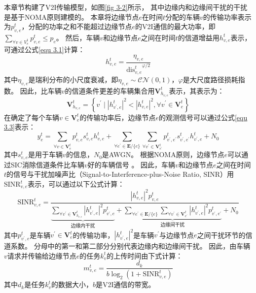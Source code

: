 本章节构建了V2I传输模型，如图\ref{fig 3-2}所示， 其中边缘内和边缘间干扰的干扰是基于NOMA原则建模的。
本章将边缘节点$e$在时间$t$分配的车辆$v$的传输功率表示为$p_{v, e}^{t}$，分配的功率之和不能超过边缘节点$e$的V2I通信的最大功率，即$\sum_{\forall v \in {V}_{e}^{t}} p_{v, e}^{t} \leq p_{e}$。
然后，车辆$v$和边缘节点$e$之间在时间$t$的信道增益用$h_{v, e}^t$表示，可通过公式\ref{equ 3.1}\cite{sun2020performance}计算：
\begin{equation}
	h_{v, e}^t = \frac{\eta_{v, e}}{{\operatorname{dis}_{v, e}^{t}}^{\varphi/2}}
	\label{equ 3.1}
\end{equation}
\noindent 其中$\eta_{v, e}$是瑞利分布的小尺度衰减，即$\eta_{v, e} \sim \mathcal{CN}(0, 1)$，$\varphi$是大尺度路径损耗指数。
因此，比车辆$v$的信道条件更差的车辆集合用$\mathbf{V}_{h_{v, e}}^{t}$表示，其表示为：
\begin{equation}
	\mathbf{V}_{h_{v, e}}^{t} = \left \{ v^{\prime} \mid  \left|h_{v^{\prime}, e}^t \right|^{2} < \left| h_{v, e}^t\right |^{2} , \forall v^{\prime} \in \mathbf{V}_{e}^{t} \right \}
\end{equation}
在确定了每个车辆$v \in \mathbf{V}_{e}^{t}$的传输功率后，边缘节点$e$的观测信号可以通过公式\ref{equ 3.3}\cite{islam2017power}表示：
\begin{equation}
	y_e^{t} = \sum_{\forall v \in \mathbf{V}_{e}^{t}} p_{v, e}^{t} s_{v, e}^{t} h_{v, e}^t + \sum\limits_{\forall e^{\prime} \in \mathbf{E} / \{e\}} \sum\limits_{\forall v^{\prime} \in \mathbf{V}_{e^{\prime}}^{t}} p_{v^{\prime}, e^{\prime}}^{t} s_{v^{\prime}, e^{\prime}}^{t} h_{v^{\prime}, e}^t + N_{0}
	\label{equ 3.3}
\end{equation}
其中$s_{v, e}^{t}$是用于车辆$v$的信息，$N_{0}$是AWGN。
根据NOMA原则，边缘节点$e$可以通过SIC消除信道条件比车辆$v$好的车辆信号 \cite{du2021ji}。
因此，车辆$v$和边缘节点$e$之间在时间$t$的信号与干扰加噪声比（Signal-to-Interference-plus-Noise Ratio, SINR）用$\mathrm{SINR}_{v, e}^t$表示，可以通过以下公式计算：
\begin{equation}
	\mathrm{SINR}_{v, e}^t = \frac{ |h_{v, e}^t| ^{2}  p_{v, e}^{t}}{ \underbrace{\sum\limits_{\forall v^{\prime} \in \mathbf{V}_{h_{v, e}}^{t}} |h_{v^{\prime}, e}^t|^2 p_{v^{\prime}, e}^{t}}_{\text {边缘内干扰}} + \underbrace{\sum\limits_{\forall e^{\prime} \in \mathbf{E} / \{e\}} \sum\limits_{\forall v^{\prime} \in \mathbf{V}_{e^{\prime}}^{t}} |h_{v^{\prime}, e}^t|^2 p_{v^{\prime}, e^{\prime}}^{t}}_{\text {边缘间干扰}} + N_{0}}
\end{equation}
其中$p_{v^{\prime}, e}^{t}$是车辆$v^{\prime} \in \mathbf{V}_{e}^{t}$的传输功率，$|h_{v^{\prime}, e}^t|^2$是车辆$v^{\prime}$与边缘节点$e$之间干扰环节的信道系数。
分母中的第一和第二部分分别代表边缘内和边缘间干扰。
因此，由车辆$v$请求并传输给边缘节点$e$的任务$k_{v}^{t}$的上传时间由下式计算：
\begin{equation}
	m_{v, e}^{t} = \frac{d_{k}}{b  \log _{2}\left(1+\mathrm{SINR}_{v, e}^t\right)}
\end{equation}
其中$d_k$是任务$k_{v}^{t}$的数据大小，$b$是V2I通信的带宽。


